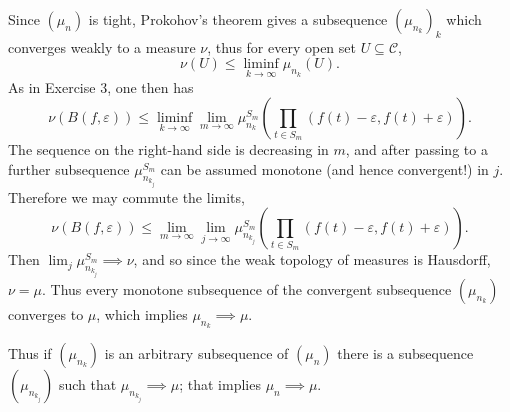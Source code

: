 \documentclass[10pt]{article}
\theoremstyle{definition}
\begin{document}
Since $(\mu_n)$ is tight, Prokohov's theorem gives a subsequence $(\mu_{n_k})_k$ which converges weakly to a measure $\nu$, thus for every open set $U \subseteq \mathcal C$,
$$\nu(U) \leq \liminf_{k \to \infty} \mu_{n_k}(U).$$
As in Exercise 3, one then has
$$\nu(B(f,\varepsilon)) \leq \liminf_{k \to \infty} \lim_{m \to \infty} \mu_{n_k}^{S_m} \left(\prod_{t \in S_m} (f(t) - \varepsilon, f(t) + \varepsilon)\right).$$
The sequence on the right-hand side is decreasing in $m$, and after passing to a further subsequence $\mu_{n_{k_j}}^{S_m}$ can be assumed monotone (and hence convergent!) in $j$. Therefore we may commute the limits,
$$\nu(B(f,\varepsilon)) \leq \lim_{m \to \infty} \lim_{j \to \infty} \mu_{n_{k_j}}^{S_m}
\left(\prod_{t \in S_m} (f(t) - \varepsilon, f(t) + \varepsilon)\right).$$
Then $\lim_j \mu_{n_{k_j}}^{S_m} \implies \nu$, and so since the weak topology of measures is Hausdorff, $\nu = \mu$.
Thus every monotone subsequence of the convergent subsequence $(\mu_{n_k})$ converges to $\mu$, which implies $\mu_{n_k} \implies \mu$.

Thus if $(\mu_{n_k})$ is an arbitrary subsequence of $(\mu_n)$ there is a subsequence $(\mu_{n_{k_j}})$ such that $\mu_{n_{k_j}} \implies \mu$; that implies $\mu_n \implies \mu$.
\end{document}
